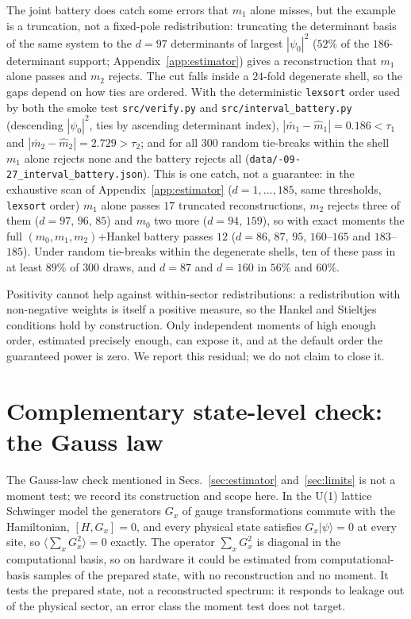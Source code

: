 \documentclass[submission, PhysCore]{SciPost}
\begin{document}
\begin{appendix}
The joint battery does catch some errors that $m_1$ alone misses, but the example is a truncation, not a fixed-pole redistribution: truncating the determinant basis of the same system to the $d=97$ determinants of largest $|\psi_0|^2$ ($52\%$ of the $186$-determinant support; Appendix~\ref{app:estimator}) gives a reconstruction that $m_1$ alone passes and $m_2$ rejects. The cut falls inside a $24$-fold degenerate shell, so the gaps depend on how ties are ordered. With the deterministic \texttt{lexsort} order used by both the smoke test \texttt{src/verify.py} and \texttt{src/\allowbreak interval\_battery.py} (descending $|\psi_0|^2$, ties by ascending determinant index), $|\bar m_1-\widehat m_1|=0.186<\tau_1$ and $|\bar m_2-\widehat m_2|=2.729>\tau_2$; and for all $300$ random tie-breaks within the shell $m_1$ alone rejects none and the battery rejects all (\texttt{data/-09-27\_interval\_battery.json}). This is one catch, not a guarantee: in the exhaustive scan of Appendix~\ref{app:estimator} ($d=1,\dots,185$, same thresholds, \texttt{lexsort} order) $m_1$ alone passes $17$ truncated reconstructions, $m_2$ rejects three of them ($d=97$, $96$, $85$) and $m_0$ two more ($d=94$, $159$), so with exact moments the full $(m_0,m_1,m_2)$+Hankel battery passes $12$ ($d=86$, $87$, $95$, $160$--$165$ and $183$--$185$). Under random tie-breaks within the degenerate shells, ten of these pass in at least $89\%$ of $300$ draws, and $d=87$ and $d=160$ in $56\%$ and $60\%$.

Positivity cannot help against within-sector redistributions: a redistribution with non-negative weights is itself a positive measure, so the Hankel and Stieltjes conditions hold by construction. Only independent moments of high enough order, estimated precisely enough, can expose it, and at the default order the guaranteed power is zero. We report this residual; we do not claim to close it.

\section{Complementary state-level check: the Gauss law}
\label{app:gauss}
The Gauss-law check mentioned in Secs.~\ref{sec:estimator} and~\ref{sec:limits} is not a moment test; we record its construction and scope here. In the U(1) lattice Schwinger model the generators $G_x$ of gauge transformations commute with the Hamiltonian, $[H,G_x]=0$, and every physical state satisfies $G_x|\psi\rangle=0$ at every site, so $\langle\sum_x G_x^2\rangle=0$ exactly. The operator $\sum_x G_x^2$ is diagonal in the computational basis, so on hardware it could be estimated from computational-basis samples of the prepared state, with no reconstruction and no moment. It tests the prepared state, not a reconstructed spectrum: it responds to leakage out of the physical sector, an error class the moment test does not target.


\end{appendix}
\end{document}
